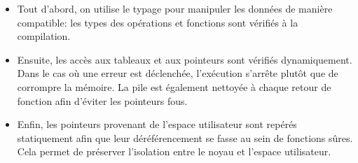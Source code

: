 \begin{itemize}
\item Tout d'abord, on utilise le typage pour manipuler les données de manière
      compatible: les types des opérations et fonctions sont vérifiés à la
      compilation.

\item Ensuite, les accès aux tableaux et aux pointeurs sont vérifiés
      dynamiquement. Dans le cas où une erreur est déclenchée, l'exécution
      s'arrête plutôt que de corrompre la mémoire. La pile est également
      nettoyée à chaque retour de fonction afin d'éviter les pointeurs fous.

\item Enfin, les pointeurs provenant de l'espace utilisateur sont repérés
      statiquement afin que leur déréférencement se fasse au sein de fonctions
      sûres. Cela permet de préserver l'isolation entre le noyau et l'espace
      utilisateur.
\end{itemize}

